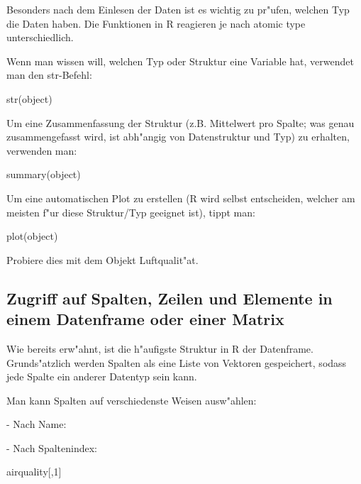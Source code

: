 \documentclass[a4paper,twoside]{tufte-book}\usepackage[]{graphicx}\usepackage[]{color}
\begin{document}
\begin{appendices}
Besonders nach dem Einlesen der Daten ist es wichtig zu pr"ufen, welchen Typ die Daten haben. Die Funktionen in R reagieren je nach atomic type unterschiedlich.

Wenn man wissen will, welchen Typ oder Struktur eine Variable hat, verwendet man den str-Befehl:

\begin{Schunk}
\begin{Sinput}
str(object)
\end{Sinput}
\end{Schunk}

Um eine Zusammenfassung der Struktur (z.B. Mittelwert pro Spalte; was genau zusammengefasst wird, ist abh"angig von Datenstruktur und Typ) zu erhalten, verwenden man:

\begin{Schunk}
\begin{Sinput}
summary(object)
\end{Sinput}
\end{Schunk}

Um eine automatischen Plot zu erstellen (R wird selbst entscheiden, welcher am meisten f"ur diese Struktur/Typ geeignet ist), tippt man:

\begin{Schunk}
\begin{Sinput}
plot(object)
\end{Sinput}
\end{Schunk}

Probiere dies mit dem Objekt Luftqualit"at.

\subsection{Zugriff auf Spalten, Zeilen und Elemente in einem Datenframe oder einer Matrix}

Wie bereits erw"ahnt, ist die h"aufigste Struktur in R der Datenframe. Grunds"atzlich werden Spalten als eine Liste von Vektoren gespeichert, sodass jede Spalte ein anderer Datentyp sein kann.

Man kann Spalten auf verschiedenste Weisen ausw"ahlen:

- Nach Name:
\begin{Schunk}
\end{Schunk}

- Nach Spaltenindex: 

\begin{Schunk}
\begin{Sinput}
airquality[,1]
\end{Sinput}
\end{Schunk}


\end{appendices}
\end{document}

